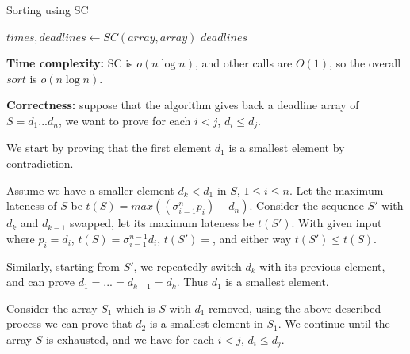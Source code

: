 \documentclass{article}
\begin{document}
\begin{description}
  \begin{algorithm}[h]
  \caption{Sorting using SC}
  \label{alg:sorting-sc}
    \begin{algorithmic}[1]
  
      \State $times, deadlines \gets SC(array, array)$
      \State \Return $deadlines$
    \EndFunction
    
    \end{algorithmic}
  \end{algorithm}

  \textbf{Time complexity:} SC is $o(n \log n)$, and other calls are $O(1)$, so the overall $sort$ is $o(n \log n)$.

  \textbf{Correctness:} suppose that the algorithm gives back a deadline array of $S=d_1...d_n$, we want to prove for each $i<j$, $d_i \leq d_j$.

  We start by proving that the first element $d_1$ is a smallest element by contradiction. 

  Assume we have a smaller element $d_k < d_1$ in $S$, $1 \leq i \leq n$. Let the maximum lateness of $S$ be $t(S) = max((\sigma_{i=1}^{n}{p_i}) - d_n)$. Consider the sequence $S'$ with $d_k$ and $d_{k-1}$ swapped, let its maximum lateness be $t(S')$. With given input where $p_i = d_i$, $t(S) = \sigma_{i=1}^{n-1}{d_i}$, $t(S') = $, and either way $t(S') \leq t(S)$. 

  Similarly, starting from $S'$, we repeatedly switch $d_k$ with its previous element, and can prove $d_1 =...= d_{k-1} = d_k$. Thus $d_1$ is a smallest element.

  Consider the array $S_1$ which is $S$ with $d_1$ removed, using the above described process we can prove that $d_2$ is a smallest element in $S_1$. We continue until the array $S$ is exhausted, and we have for each $i<j$, $d_i \leq d_j$.

\end{description}
\end{document}
